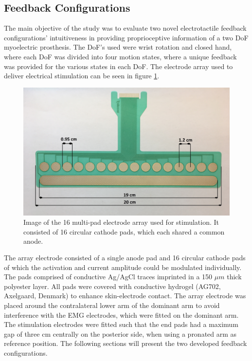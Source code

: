 \subsection{Feedback Configurations}
The main objective of the study was to evaluate two novel electrotactile feedback configurations' intuitiveness in providing proprioceptive information of a two DoF myoelectric prosthesis. 
The DoF's used were wrist rotation and closed hand, where each DoF was divided into four motion states, where a unique feedback was provided for the various states in each DoF. The electrode array used to deliver electrical stimulation can be seen in figure \ref{fig:pa:electrode}.
\begin{figure}[H]                 
	\includegraphics[width=.95\textwidth]{figures/electrode}  
	\caption{Image of the 16 multi-pad electrode array used for stimulation. It consisted of 16 circular cathode pads, which each shared a common anode.}
	\label{fig:pa:electrode} 
\end{figure}
The array electrode consisted of a single anode pad and 16 circular cathode pads of which the activation and current amplitude could be modulated individually. The pads comprised of conductive Ag/AgCl traces imprinted in a 150 $\mu m$ thick polyester layer. All pads were covered with conductive hydrogel (AG702, Axelgaard, Denmark) to enhance skin-electrode contact. The array electrode was placed around the contralateral lower arm of the dominant arm to avoid interference with the EMG electrodes, which were fitted on the dominant arm. The stimulation electrodes were fitted such that the end pads had a maximum gap of three cm centrally on the posterior side, when using a pronated arm as reference position. The following sections will present the two developed feedback configurations. 


